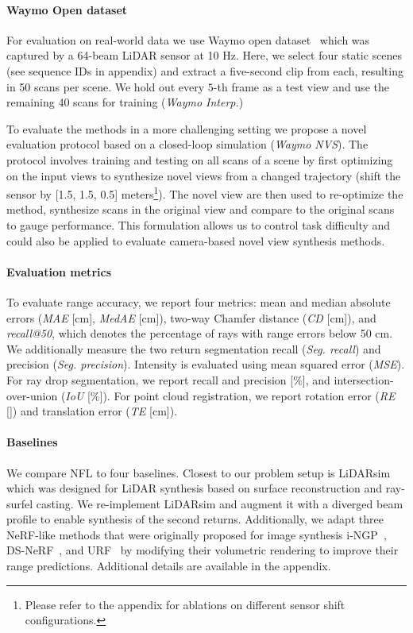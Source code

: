  \paragraph{Waymo Open dataset}
 For evaluation on real-world data we use Waymo open dataset~\cite{sun2020scalability} which was captured by a 64-beam LiDAR sensor at 10 Hz. Here, we select four static scenes (see sequence IDs in appendix) and extract a five-second clip from each, resulting in 50 scans per scene. We hold out every $5$-th frame as a test view and use the remaining 40 scans for training (\textit{Waymo Interp.})
 
To evaluate the methods in a more challenging setting we propose a novel evaluation protocol based on a closed-loop simulation (\emph{Waymo NVS}). The protocol involves training and testing on all scans of a scene by first optimizing on the input views to synthesize novel views from a changed trajectory (shift the sensor by [1.5, 1.5, 0.5] meters\footnote{Please refer to the appendix for ablations on different sensor shift configurations.}). The novel view are then used to re-optimize the method, synthesize scans in the original view and compare to the original scans to gauge performance. This formulation allows us to control task difficulty and could also be applied to evaluate camera-based novel view synthesis methods.



\paragraph{Evaluation metrics}
To evaluate range accuracy, we report four metrics: mean and median absolute errors (\textit{MAE} [cm], \textit{MedAE} [cm]),  two-way Chamfer distance (\textit{CD} [cm]), and \textit{recall@50}, which denotes the percentage of rays with range errors below 50 cm. 
We additionally measure the two return segmentation recall (\textit{Seg. recall}) and precision (\textit{Seg. precision}).
Intensity is evaluated using mean squared error (\textit{MSE}).
For ray drop segmentation, we report recall and precision [$\%$], and intersection-over-union (\textit{IoU} [$\%$]). For point cloud registration, we report rotation error (\textit{RE} [\degree]) and translation error (\textit{TE} [cm]).


\paragraph{Baselines}
We compare NFL to four baselines. Closest to our problem setup is LiDARsim~\cite{manivasagam2020lidarsim} which was designed for LiDAR synthesis based on surface reconstruction and ray-surfel casting. We re-implement LiDARsim and augment it with a diverged beam profile to enable synthesis of the second returns. Additionally, we adapt three NeRF-like methods that were originally proposed for image synthesis i-NGP~\cite{mueller2022instant}, DS-NeRF~\cite{deng2021depth}, and URF~\cite{rematas2021urban} by modifying their volumetric rendering to improve their range predictions. 
Additional details are available in the appendix.


